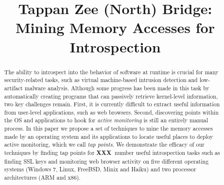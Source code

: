 \documentclass{acm_proc_article-sp}
\newcommand{\fixme}{{\bf XXX\ }}
\begin{document}
\date{}

\title{Tappan Zee (North) Bridge: Mining Memory Accesses for Introspection}

%

\maketitle


\begin{abstract}

The ability to introspect into the behavior of software at runtime is
crucial for many security-related tasks, such as virtual machine-based
intrusion detection and low-artifact malware analysis. Although some
progress has been made in this task by automatically creating programs
that can passively retrieve kernel-level information, two key challenges
remain. First, it is currently difficult to extract useful information
from user-level applications, such as web browsers. Second, discovering
points within the OS and applications to hook for \emph{active
monitoring} is still an entirely manual process. In this paper we
propose a set of techniques to mine the memory accesses made by an
operating system and its applications to locate useful places to deploy
active monitoring, which we call \emph{tap points}. We demonstrate the
efficacy of our techniques by finding tap points for \fixme{number}
useful introspection tasks such as finding SSL keys and monitoring web
browser activity on five different operating systems (Windows 7, Linux,
FreeBSD, Minix and Haiku) and two processor architectures (ARM and x86).

\end{abstract}




















%
\end{document}
